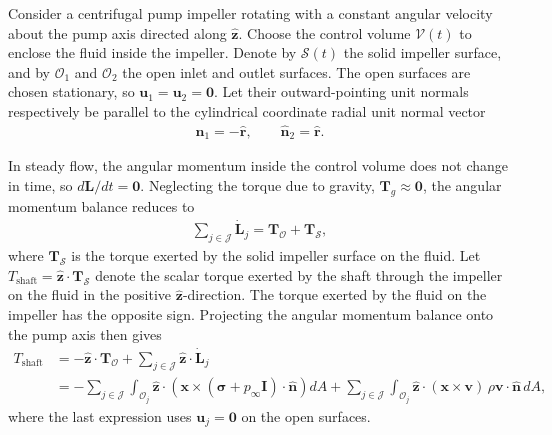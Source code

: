 \begin{example}
    Consider a centrifugal pump impeller rotating with a constant angular velocity about the pump axis directed along $\bm{\hat{z}}$. Choose the control volume $\mathcal{V}(t)$ to enclose the fluid inside the impeller. Denote by $\mathcal{S}(t)$ the solid impeller surface, and by $\mathcal{O}_1$ and $\mathcal{O}_2$ the open inlet and outlet surfaces. The open surfaces are chosen stationary, so $\bm{u}_1=\bm{u}_2=\bm{0}$. Let their outward-pointing unit normals respectively be parallel to the cylindrical coordinate radial unit normal vector
    \begin{align*}
        \bm{\hat{n}}_1=-\bm{\hat{r}}, \qquad \bm{\hat{n}}_2=\bm{\hat{r}}.
    \end{align*}
    
    In steady flow, the angular momentum inside the control volume does not change in time, so $d\bm{L}/dt=\bm{0}$. Neglecting the torque due to gravity, $\bm{T}_g\approx\bm{0}$, the angular momentum balance reduces to
    \begin{align*}
        \sum_{j\in\mathcal{J}}\dot{\bm{L}}_j=\bm{T}_\mathcal{O}+\bm{T}_\mathcal{S},
    \end{align*}
    where $\bm{T}_\mathcal{S}$ is the torque exerted by the solid impeller surface on the fluid. Let $T_\text{shaft}=\bm{\hat{z}}\cdot\bm{T}_\mathcal{S}$ denote the scalar torque exerted by the shaft through the impeller on the fluid in the positive $\bm{\hat{z}}$-direction. The torque exerted by the fluid on the impeller has the opposite sign. Projecting the angular momentum balance onto the pump axis then gives
    \begin{align*}
        T_\text{shaft}&=-\bm{\hat{z}}\cdot\bm{T}_\mathcal{O}+\sum_{j\in\mathcal{J}}\bm{\hat{z}}\cdot\dot{\bm{L}}_j
        \\
        &=-\sum_{j\in\mathcal{J}}\int_{\mathcal{O}_j}\bm{\hat{z}}\cdot\left(\bm{x}\times(\bm{\sigma}+p_\infty\bm{I})\cdot\bm{\hat{n}}\right)dA+\sum_{j\in\mathcal{J}}\int_{\mathcal{O}_j}\bm{\hat{z}}\cdot(\bm{x}\times\bm{v})\,\rho\bm{v}\cdot\bm{\hat{n}}\,dA,
    \end{align*}
    where the last expression uses $\bm{u}_j=\bm{0}$ on the open surfaces.


\end{example}
